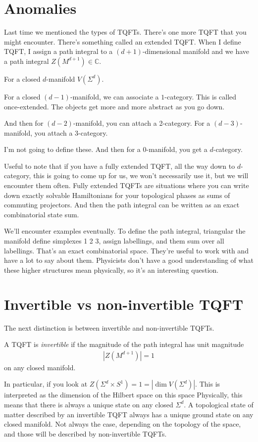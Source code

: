 \section{Anomalies}
Last time we mentioned the types of TQFTs.
There's one more TQFT that you might encounter.
There's something called an extended TQFT.
When I define TQFT,
I assign a path integral to a $(d+1)$-dimensional manifold
and we have a path integral
$Z\left( M^{d+1} \right)\in \mathbb{C}$.

For a closed $d$-manifold $V(\Sigma^d)$.

For a closed $(d-1)$-manifold,
we can associate a $1$-category.
This is called once-extended.
The objects get more and more abstract as you go down.

And then for $(d - 2)$-manifold,
you can attach a 2-category.
For a $(d-3)$-manifold,
you attach a 3-category.

I'm not going to define these.
And then for a 0-manifold,
you get a $d$-category.

Useful to note that if you have a fully extended TQFT,
all the way down to $d$-category,
this is going to come up for us,
we won't necessarily use it,
but we will encounter them often.
Fully extended TQFTs are situations where you can write down exactly solvable
Hamiltonians for your topological phases as sums of commuting projectors.
And then the path integral can be written as an exact combinatorial state sum.

We'll encounter examples eventually.
To define the path integral,
triangular the manifold
define simplexes 1 2 3,
assign labellings,
and them sum over all labellings.
That's an exact combinatorial space.
They're useful to work with and have a lot to say about them.
Physicists don't have a good understanding of what these higher structures mean
physically,
so it's an interesting question.


\section{Invertible vs non-invertible TQFT}
The next distinction is between invertible and non-invertible TQFTs.

\begin{definition}
    A TQFT is \emph{invertible} if the magnitude of the path integral has unit
    magnitude
    \begin{align}
        |Z(M^{d+1})| = 1
    \end{align}
    on any closed manifold.
\end{definition}
In particular, if you look at $Z(\Sigma^d\times S^1) = 1
= |\dim V(\Sigma^d)|$.
This is interpreted as the dimension of the Hilbert space on this space
Physically,
this means that there is always a unique state on any closed $\Sigma^d$.
A topological state of matter described by an invertible TQFT always has a
unique ground state on any closed manifold.
Not always the case,
depending on the topology of the space,
and those will be described by non-invertible TQFTs.

